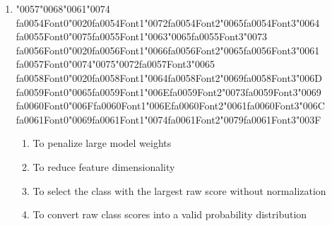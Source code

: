 \documentclass[12pt]{article}
\begin{document}
\begin{enumerate}[label=Q\arabic*.]
\item {\char"0057}{\char"0068}{\char"0061}{\char"0074} {\csname fa0054Font0\endcsname\char"0020}{\csname fa0054Font1\endcsname\char"0072}{\csname fa0054Font2\endcsname\char"0065}{\csname fa0054Font3\endcsname\char"0064} {\csname fa0055Font0\endcsname\char"0075}{\csname fa0055Font1\endcsname\char"0063}{\char"0065}{\csname fa0055Font3\endcsname\char"0073} {\csname fa0056Font0\endcsname\char"0020}{\csname fa0056Font1\endcsname\char"0066}{\csname fa0056Font2\endcsname\char"0065}{\csname fa0056Font3\endcsname\char"0061} {\csname fa0057Font0\endcsname\char"0074}{\char"0075}{\char"0072}{\csname fa0057Font3\endcsname\char"0065} {\csname fa0058Font0\endcsname\char"0020}{\csname fa0058Font1\endcsname\char"0064}{\csname fa0058Font2\endcsname\char"0069}{\csname fa0058Font3\endcsname\char"006D} {\csname fa0059Font0\endcsname\char"0065}{\csname fa0059Font1\endcsname\char"006E}{\csname fa0059Font2\endcsname\char"0073}{\csname fa0059Font3\endcsname\char"0069} {\csname fa0060Font0\endcsname\char"006F}{\csname fa0060Font1\endcsname\char"006E}{\csname fa0060Font2\endcsname\char"0061}{\csname fa0060Font3\endcsname\char"006C} {\csname fa0061Font0\endcsname\char"0069}{\csname fa0061Font1\endcsname\char"0074}{\csname fa0061Font2\endcsname\char"0079}{\csname fa0061Font3\endcsname\char"003F}
\begin{enumerate}[label=(\Alph*)]
    \item To penalize large model weights
    \item To reduce feature dimensionality
    \item To select the class with the largest raw score without normalization
    \item To convert raw class scores into a valid probability distribution
\end{enumerate}

\end{enumerate}
\end{document}
